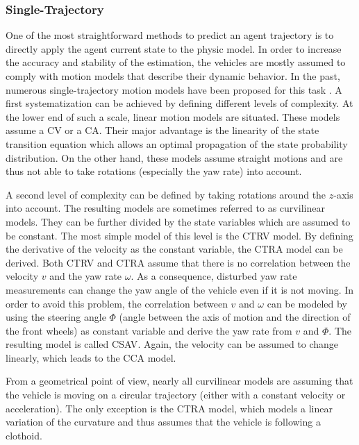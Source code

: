\subsubsection{Single-Trajectory}
\label{subsubsec:2_single_trajectory_mp}

One of the most straightforward methods to predict an agent trajectory is to directly apply the agent current state to the physic model. In order to increase the accuracy and stability of the estimation, the vehicles are mostly assumed to comply with motion models that describe their dynamic behavior. In the past, numerous single-trajectory motion models have been proposed for this task \cite{miller2002adaptive, pepy2006reducing, hillenbrand2006multilevel}. A first systematization can be achieved by defining different levels of complexity. At the lower end of such a scale, linear motion models are situated. These models assume a \ac{CV} or a \ac{CA}. Their major advantage is the linearity of the state transition equation which allows an optimal propagation of the state probability distribution. On the other hand, these models assume straight motions and are thus not able to take rotations (especially the yaw rate) into account. 

A second level of complexity can be defined by taking rotations around the $z$-axis into account. The resulting models are sometimes referred to as curvilinear models. They can be further divided by the state variables which are assumed to be constant. The most simple model of this level is the \ac{CTRV} model. By defining the derivative of the velocity as the constant variable, the \ac{CTRA} model can be derived. Both \ac{CTRV} and \ac{CTRA} assume that there is no correlation between the velocity $v$ and the yaw rate $\omega$. As a consequence, disturbed yaw rate measurements can change the yaw angle of the vehicle even if it is not moving. In order to avoid this problem, the correlation between $v$ and $\omega$ can be modeled by using the steering angle $\Phi$ (angle between the axis of motion and the direction of the front wheels) as constant variable and derive the yaw rate from $v$ and $\Phi$. The resulting model is called \ac{CSAV}. Again, the velocity can be assumed to change linearly, which leads to the \ac{CCA} model. 

From a geometrical point of view, nearly all curvilinear models are assuming that the vehicle is moving on a circular trajectory (either with a constant velocity or acceleration). The only exception is the \ac{CTRA} model, which models a linear variation of the curvature and thus assumes that the vehicle is following a clothoid. 


